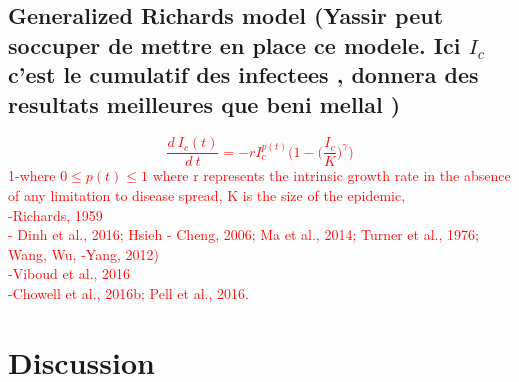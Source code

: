 \documentclass[final,a4paper,reqno]{elsarticle}
\numberwithin{equation}{section}
\begin{document}
\subsection{Generalized Richards model (Yassir peut soccuper de mettre en place ce modele. Ici $I_c$ c'est le cumulatif des infectees , donnera des resultats meilleures que beni mellal  )}
\textcolor{red}{ 
\begin{equation}\label{Covid-GR-system}
\displaystyle \frac{ d\:I_{c}(t)}{d\:t} = -r I_c^{p(t)} \Big(1- \Big(\frac{I_{c}}{K}\big)^{\gamma} \Big)
\end{equation}
1-where  $0\leq p(t)\leq1$ where r represents the intrinsic growth rate in the absence of any limitation to disease spread, K is the size of the epidemic,\\
-Richards, 1959\\
- Dinh et al., 2016; Hsieh - Cheng, 2006; Ma et al., 2014; Turner et al., 1976; Wang, Wu, -Yang, 2012)\\
-Viboud et al., 2016\\
-Chowell et al., 2016b; Pell et al., 2016.
}
%

\section{Discussion}
\end{document}
